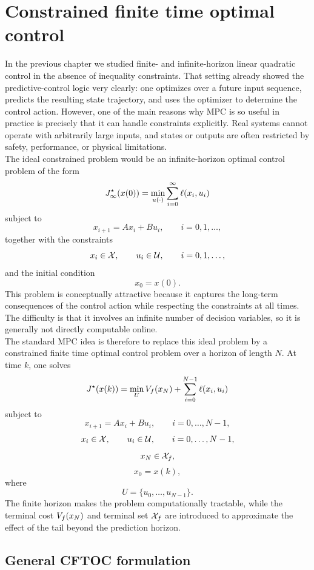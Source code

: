 \section{Constrained finite time optimal control}

In the previous chapter we studied finite- and infinite-horizon linear quadratic control in the
absence of inequality constraints. That setting already showed the predictive-control logic very
clearly: one optimizes over a future input sequence, predicts the resulting state trajectory, and
uses the optimizer to determine the control action. However, one of the main reasons why MPC
is so useful in practice is precisely that it can handle constraints explicitly. Real systems cannot
operate with arbitrarily large inputs, and states or outputs are often restricted by safety,
performance, or physical limitations.\\

The ideal constrained problem would be an infinite-horizon optimal control problem of the form
\[
J_\infty^\star(x(0))
=
\min_{u(\cdot)}
\sum_{i=0}^{\infty} \ell(x_i,u_i)
\]
subject to
\[
x_{i+1}=Ax_i+Bu_i,\qquad i=0,1,\dots,
\]
together with the constraints
\[
x_i\in\mathcal{X},\qquad u_i\in\mathcal{U},\qquad i=0,1,\dots,
\]
and the initial condition
\[
x_0=x(0).
\]
This problem is conceptually attractive because it captures the long-term consequences of the
control action while respecting the constraints at all times. The difficulty is that it involves an
infinite number of decision variables, so it is generally not directly computable online.\\

The standard MPC idea is therefore to replace this ideal problem by a constrained finite time
optimal control problem over a horizon of length \(N\). At time \(k\), one solves
\[
J^\star(x(k))
=
\min_{U}
V_f(x_N)+\sum_{i=0}^{N-1}\ell(x_i,u_i)
\]
subject to
\[
x_{i+1}=Ax_i+Bu_i,\qquad i=0,\dots,N-1,
\]
\[
x_i\in\mathcal{X},\qquad u_i\in\mathcal{U},\qquad i=0,\dots,N-1,
\]
\[
x_N\in \mathcal{X}_f,
\]
\[
x_0=x(k),
\]
where
\[
U=\{u_0,\dots,u_{N-1}\}.
\]
The finite horizon makes the problem computationally tractable, while the terminal cost
\(V_f(x_N)\) and terminal set \(\mathcal{X}_f\) are introduced to approximate the effect of the
tail beyond the prediction horizon.

\subsection{General CFTOC formulation}

